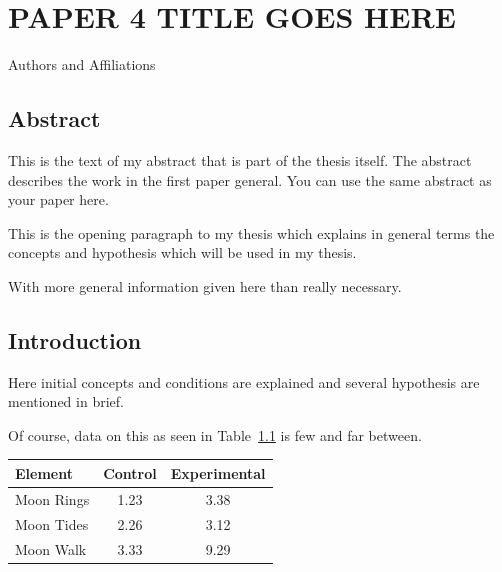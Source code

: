 \chapter{PAPER 4 TITLE GOES HERE}

\begin{center}
    Authors and Affiliations %
\end{center}

\section{Abstract}
This is the text of my abstract that is part of the thesis itself.
The abstract describes the work in the first paper general. You can use the same abstract as your paper here.



This is the opening paragraph to my thesis which
explains in general terms the concepts and hypothesis
which will be used in my thesis.

With more general information given here than really
necessary.

\section{Introduction}

Here initial concepts and conditions are explained and
several hypothesis are mentioned in brief.

Of course, data on this as seen in Table~\ref{data}
is few and far between.

\begin{table}[h!tb] \centering
{}
\label{data}
\begin{tabular}{lcc} \hline
\textbf{Element} & \textbf{Control} & \textbf{Experimental} \\ \hline
Moon Rings & 1.23 & 3.38 \\
Moon Tides & 2.26 & 3.12 \\
Moon Walk & 3.33 & 9.29 \\ \hline
\end{tabular}
\end{table}


